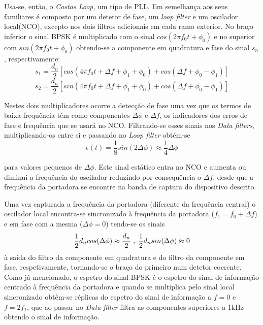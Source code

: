 \documentclass[11pt]{article}
\numberwithin{equation}{section}
\begin{document}
Usa-se, então, o \textit{Costas Loop}, um tipo de PLL. Em semelhança aos seus familiares é composto por um detetor de fase, um \textit{loop filter} e um oscilador local(NCO), excepto nos dois filtros adicionais em cada ramo exterior. No braço inferior o sinal BPSK é multiplicado com o sinal $cos(2\pi f_0t+\phi_0)$ e no superior com $sin(2\pi f_0t+ \phi_0)$ obtendo-se a componente em quadratura e fase do sinal $s_n$, respectivamente: 
\begin{equation}
s_1=\frac{d_n}{2}[cos(4\pi f_0t+\Delta f+\phi_1+\phi_0)+cos(\Delta f+\phi_0-\phi_1)]
\end{equation}
\begin{equation}
s_2=\frac{d_n}{2}[sin(4\pi f_0t+\Delta f+\phi_1+\phi_0)+cos(\Delta f+\phi_0-\phi_1)]
\end{equation} 

Nestes dois multiplicadores ocorre a detecção de fase uma vez que os termos de baixa frequência têm como componentes $\Delta\phi$ e $\Delta f$, os indicadores dos erros de fase e frequência que se usará no NCO. Filtrando-se esses sinais nos \textit{Data filters}, multiplicando-os entre si e passando no \textit{Loop filter} obtém-se 
\begin{equation}
\epsilon(t)=\frac{1}{8}sin(2\Delta\phi)\approx\frac{1}{4}\Delta\phi
\end{equation}


para valores pequenos de $\Delta\phi$. Este sinal estático entra no NCO e aumenta ou diminui a frequência do oscilador reduzindo por consequência o $\Delta f$, desde que a frequência da portadora se encontre na banda de captura do dispositivo descrito.

Uma vez capturada a frequência da portadora (diferente da frequência central) o oscilador local encontra-se sincronizado à frequência da portadora ($f_1 = f_0+\Delta f$) e em fase com a mesma ($\Delta\phi=0$) tendo-se os sinais
\begin{equation}
\frac{1}{2}d_ncos(\Delta\phi)\approx\dfrac{d_n}{2} \hspace{1mm}, \hspace{1mm} \frac{1}{2}d_nsin(\Delta\phi)\approx 0
\end{equation}
à saída do filtro da componente em quadratura e do filtro da componente em fase, respetivamente, tornando-se o braço do primeiro num detetor coerente. Como já mencionado, o espetro do sinal BPSK é o espetro do sinal de informação centrado à frequência da portadora e quando se multiplica pelo sinal local sincronizado obtêm-se réplicas do espetro do sinal de informação a $f=0$ e $f=2f_1$, que ao passar no \textit{Data filter} filtra as componentes superiores a 1kHz obtendo o sinal de informação.
\end{document}

